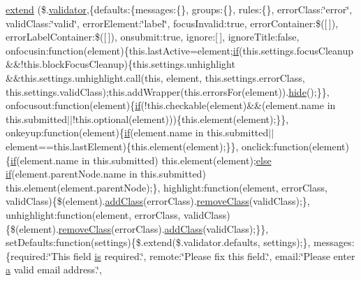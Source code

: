 \begin{DoxyCompactItemize}
\hyperlink{packages_2j_query_8_validation_81_811_81_2_content_2_scripts_2jquery_8validate-vsdoc_8js_a7f3cff8052d86204c557fc71867b777c}{extend} (\$.\hyperlink{packages_2j_query_8_validation_81_811_81_2_content_2_scripts_2jquery_8validate_8js_a2dc8272bb221cdffcccbd20db038f172}{validator},\{defaults\+:\{messages\+:\{\}, groups\+:\{\}, rules\+:\{\}, error\+Class\+:\char`\"{}error\char`\"{}, valid\+Class\+:\char`\"{}valid\char`\"{}, error\+Element\+:\char`\"{}label\char`\"{}, focus\+Invalid\+:true, error\+Container\+:\$(\mbox{[}$\,$\mbox{]}), error\+Label\+Container\+:\$(\mbox{[}$\,$\mbox{]}), onsubmit\+:true, ignore\+:\mbox{[}$\,$\mbox{]}, ignore\+Title\+:false, onfocusin\+:function(element)\{this.\+last\+Active=element;\hyperlink{packages_2_respond_81_82_80_2content_2_scripts_2respond_8min_8js_a93851d60dd037a83509a1757b9ee7b66}{if}(this.\+settings.\+focus\+Cleanup \&\&!this.\+block\+Focus\+Cleanup)\{this.\+settings.\+unhighlight \&\&this.\+settings.\+unhighlight.\+call(this, element, this.\+settings.\+error\+Class, this.\+settings.\+valid\+Class);this.\+add\+Wrapper(this.\+errors\+For(element)).\hyperlink{jquery-1_810_82-vsdoc_8js_ab184a969b4c8542290dae744d90fd4d2}{hide}();\}\}, onfocusout\+:function(element)\{\hyperlink{packages_2_respond_81_82_80_2content_2_scripts_2respond_8min_8js_a93851d60dd037a83509a1757b9ee7b66}{if}(!this.\+checkable(element)\&\&(element.\+name in this.\+submitted$\vert$$\vert$!this.\+optional(element)))\{this.\+element(element);\}\}, onkeyup\+:function(element)\{\hyperlink{packages_2_respond_81_82_80_2content_2_scripts_2respond_8min_8js_a93851d60dd037a83509a1757b9ee7b66}{if}(element.\+name in this.\+submitted$\vert$$\vert$element==this.\+last\+Element)\{this.\+element(element);\}\}, onclick\+:function(element)\{\hyperlink{packages_2_respond_81_82_80_2content_2_scripts_2respond_8min_8js_a93851d60dd037a83509a1757b9ee7b66}{if}(element.\+name in this.\+submitted) this.\+element(element);\hyperlink{packages_2j_query_8_validation_81_811_81_2_content_2_scripts_2jquery_8validate_8js_a0544c3fe466e421738dae463968b70ba}{else} \hyperlink{packages_2_respond_81_82_80_2content_2_scripts_2respond_8min_8js_a93851d60dd037a83509a1757b9ee7b66}{if}(element.\+parent\+Node.\+name in this.\+submitted) this.\+element(element.\+parent\+Node);\}, highlight\+:function(element, error\+Class, valid\+Class)\{\$(element).\hyperlink{jquery-1_810_82-vsdoc_8js_ac98f6924e42def59f1eb8d3ea1892a8e}{add\+Class}(error\+Class).\hyperlink{jquery-1_810_82-vsdoc_8js_a7cb7158f409485c170580c2afea3e234}{remove\+Class}(valid\+Class);\}, unhighlight\+:function(element, error\+Class, valid\+Class)\{\$(element).\hyperlink{jquery-1_810_82-vsdoc_8js_a7cb7158f409485c170580c2afea3e234}{remove\+Class}(error\+Class).\hyperlink{jquery-1_810_82-vsdoc_8js_ac98f6924e42def59f1eb8d3ea1892a8e}{add\+Class}(valid\+Class);\}\}, set\+Defaults\+:function(settings)\{\$.extend(\$.validator.\+defaults, settings);\}, messages\+:\{required\+:\char`\"{}This field \hyperlink{jquery-1_810_82-vsdoc_8js_ab09af0fb8923d70813f6d128591d1962}{is} required.\char`\"{}, remote\+:\char`\"{}Please fix this field.\char`\"{}, email\+:\char`\"{}Please enter \hyperlink{packages_2bootstrap_83_80_80_2content_2_scripts_2bootstrap_8min_8js_a7318f59fb86a4437995ee89c780c51ac}{a} valid email address.\char`\"{}, 
\end{DoxyCompactItemize}
